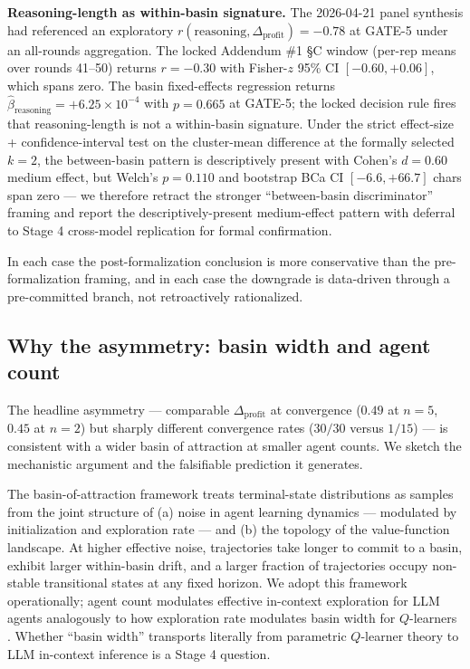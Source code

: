 \textbf{Reasoning-length as within-basin signature.} The 2026-04-21 panel synthesis had referenced an exploratory $r(\text{reasoning}, \Delta_{\text{profit}}) = -0.78$ at GATE-5 under an all-rounds aggregation. The locked Addendum \#1 \S C window (per-rep means over rounds 41--50) returns $r = -0.30$ with Fisher-$z$ 95\% CI $[-0.60, +0.06]$, which spans zero. The basin fixed-effects regression returns $\hat{\beta}_{\text{reasoning}} = +6.25 \times 10^{-4}$ with $p = 0.665$ at GATE-5; the locked decision rule fires that reasoning-length is not a within-basin signature. Under the strict effect-size + confidence-interval test on the cluster-mean difference at the formally selected $k = 2$, the between-basin pattern is descriptively present with Cohen's $d = 0.60$ medium effect, but Welch's $p = 0.110$ and bootstrap BCa CI $[-6.6, +66.7]$ chars span zero --- we therefore retract the stronger ``between-basin discriminator'' framing and report the descriptively-present medium-effect pattern with deferral to Stage 4 cross-model replication for formal confirmation.

In each case the post-formalization conclusion is more conservative than the pre-formalization framing, and in each case the downgrade is data-driven through a pre-committed branch, not retroactively rationalized.

\subsection{Why the asymmetry: basin width and agent count}
\label{sec:discussion-asymmetry}

The headline asymmetry --- comparable $\Delta_{\text{profit}}$ at convergence ($0.49$ at $n = 5$, $0.45$ at $n = 2$) but sharply different convergence rates ($30/30$ versus $1/15$) --- is consistent with a wider basin of attraction at smaller agent counts. We sketch the mechanistic argument and the falsifiable prediction it generates.

The basin-of-attraction framework \citep{wunder_littman_babes_2010_qlearning_basin,benaim_hofbauer_sorin_2005_stochastic_approximation_differential_inclusions,askenazi2024bounds} treats terminal-state distributions as samples from the joint structure of (a) noise in agent learning dynamics --- modulated by initialization and exploration rate --- and (b) the topology of the value-function landscape. At higher effective noise, trajectories take longer to commit to a basin, exhibit larger within-basin drift, and a larger fraction of trajectories occupy non-stable transitional states at any fixed horizon. We adopt this framework operationally; agent count modulates effective in-context exploration for LLM agents analogously to how exploration rate modulates basin width for $Q$-learners \citep{askenazi2024bounds}. Whether ``basin width'' transports literally from parametric $Q$-learner theory to LLM in-context inference is a Stage 4 question.

